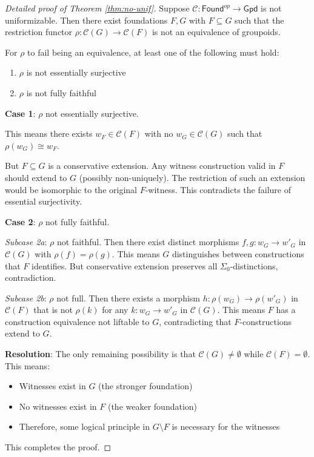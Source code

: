 \documentclass[11pt]{article}
\theoremstyle{plain}
\theoremstyle{definition}
\newcommand{\Found}{\mathsf{Found}}
\newcommand{\Gpd}{\mathsf{Gpd}}
\newcommand{\SigmaZero}{\Sigma_{0}}
\begin{document}
\begin{proof}[Detailed proof of Theorem \ref{thm:no-unif}]
Suppose $\mathcal{C}: \Found^{op} \to \Gpd$ is not uniformizable. Then there exist foundations $F, G$ with $F \subseteq G$ such that the restriction functor $\rho: \mathcal{C}(G) \to \mathcal{C}(F)$ is not an equivalence of groupoids.

For $\rho$ to fail being an equivalence, at least one of the following must hold:
\begin{enumerate}
\item $\rho$ is not essentially surjective
\item $\rho$ is not fully faithful
\end{enumerate}

\textbf{Case 1}: $\rho$ not essentially surjective.

This means there exists $w_F \in \mathcal{C}(F)$ with no $w_G \in \mathcal{C}(G)$ such that $\rho(w_G) \cong w_F$.

But $F \subseteq G$ is a conservative extension. Any witness construction valid in $F$ should extend to $G$ (possibly non-uniquely). The restriction of such an extension would be isomorphic to the original $F$-witness. This contradicts the failure of essential surjectivity.

\textbf{Case 2}: $\rho$ not fully faithful.

\emph{Subcase 2a}: $\rho$ not faithful. Then there exist distinct morphisms $f, g: w_G \to w'_G$ in $\mathcal{C}(G)$ with $\rho(f) = \rho(g)$. This means $G$ distinguishes between constructions that $F$ identifies. But conservative extension preserves all $\SigmaZero$-distinctions, contradiction.

\emph{Subcase 2b}: $\rho$ not full. Then there exists a morphism $h: \rho(w_G) \to \rho(w'_G)$ in $\mathcal{C}(F)$ that is not $\rho(k)$ for any $k: w_G \to w'_G$ in $\mathcal{C}(G)$. This means $F$ has a construction equivalence not liftable to $G$, contradicting that $F$-constructions extend to $G$.

\textbf{Resolution}: The only remaining possibility is that $\mathcal{C}(G) \neq \emptyset$ while $\mathcal{C}(F) = \emptyset$. This means:
\begin{itemize}
\item Witnesses exist in $G$ (the stronger foundation)
\item No witnesses exist in $F$ (the weaker foundation)
\item Therefore, some logical principle in $G \setminus F$ is necessary for the witnesses
\end{itemize}

This completes the proof.
\end{proof}
\end{document}
